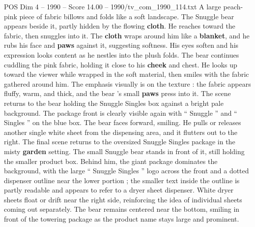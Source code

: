 \begin{textsample}{POS Dim 4 – 1990 – Score 14.00 – 1990/tv\_com\_1990\_114.txt}
A large peach-pink piece of fabric billows and folds like a soft landscape.
The Snuggle bear appears beside it, partly hidden by the flowing \textbf{cloth}.
He reaches toward the fabric, then snuggles into it.
The \textbf{cloth} wraps around him like a \textbf{blanket}, and he rubs his face and \textbf{paws} against it, suggesting softness.
His eyes soften and his expression looks content as he nestles into the plush folds.
The bear continues cuddling the pink fabric, holding it close to his \textbf{cheek} and chest.
He looks up toward the viewer while wrapped in the soft material, then smiles with the fabric gathered around him.
The emphasis visually is on the texture : the fabric appears fluffy, warm, and thick, and the bear ’s small \textbf{paws} press into it.
The scene returns to the bear holding the Snuggle Singles box against a bright pale background.
The package front is clearly visible again with “ Snuggle ” and “ Singles ” on the blue box.
The bear faces forward, smiling.
He pulls or releases another single white sheet from the dispensing area, and it flutters out to the right.
The final scene returns to the oversized Snuggle Singles package in the misty \textbf{garden} setting.
The small Snuggle bear stands in front of it, still holding the smaller product box.
Behind him, the giant package dominates the background, with the large “ Snuggle Singles ” logo across the front and a dotted dispenser outline near the lower portion ; the smaller text inside the outline is partly readable and appears to refer to a dryer sheet dispenser.
White dryer sheets float or drift near the right side, reinforcing the idea of individual sheets coming out separately.
The bear remains centered near the bottom, smiling in front of the towering package as the product name stays large and prominent.

\end{textsample}
